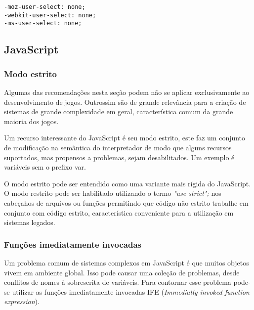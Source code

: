 \begin{draft}
\begin{verbatim}
-moz-user-select: none;
-webkit-user-select: none;
-ms-user-select: none;
\end{verbatim}

\subsection{JavaScript}

\subsubsection{Modo estrito}
Algumas das recomendações nesta seção podem não se aplicar
exclusivamente ao desenvolvimento de jogos. Outrossim são de grande
relevância para a criação de sistemas de grande complexidade em geral,
característica comum da grande maioria dos jogos.

Um recurso interessante do JavaScript é seu modo estrito, este faz
um conjunto de modificação na semântica do interpretador de modo
que alguns recursos suportados, mas propensos a problemas, sejam
desabilitados. Um exemplo é variáveis sem o prefixo var.

O modo estrito pode ser entendido como uma variante mais rígida
do JavaScript. O modo restrito pode ser habilitado utilizando o
termo \textit{"use strict";} nos cabeçahos de arquivos ou funções
permitindo que código não estrito trabalhe em conjunto com código
estrito, característica conveniente para a utilização em sistemas
legados.

\subsubsection{Funções imediatamente invocadas}

Um problema comum de sistemas complexos em JavaScript é que muitos
objetos vivem em ambiente global. Isso pode causar uma coleção de
problemas, desde conflitos de nomes à sobrescrita de variáveis. Para
contornar esse problema pode-se utilizar as funções imediatamente
invocadas IFE (\textit{Immediatly invoked function expression}).
\end{draft}

